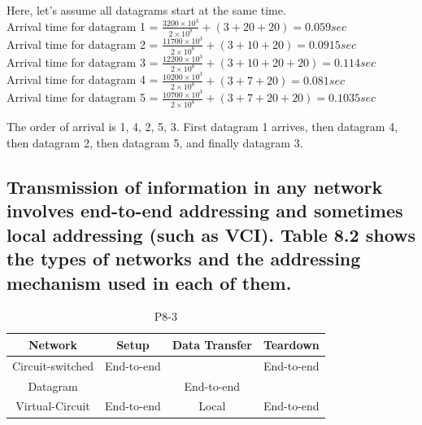 \documentclass{article}
\begin{document}
Here, let's assume all datagrams start at the same time. \\
Arrival time for datagram 1 = $ \frac{3200 \times 10^3}{2 \times 10^8} + (3 + 20 + 20) = 0.059 sec $ \\
Arrival time for datagram 2 = $ \frac{11700 \times 10^3}{2 \times 10^8} + (3 + 10 + 20) = 0.0915 sec $ \\
Arrival time for datagram 3 = $ \frac{12200 \times 10^3}{2 \times 10^8} + (3 + 10 + 20 + 20) = 0.114 sec $ \\
Arrival time for datagram 4 = $ \frac{10200 \times 10^3}{2 \times 10^8} + (3 + 7 + 20) = 0.081 sec $ \\
Arrival time for datagram 5 = $ \frac{10700 \times 10^3}{2 \times 10^8} + (3 + 7 + 20 + 20) = 0.1035 sec $ \par
The order of arrival is 1, 4, 2, 5, 3. First datagram 1 arrives, then datagram 4, then datagram 2, then datagram 5, and finally datagram 3. \par

\subsection{
	Transmission of information in any network involves end-to-end addressing
	and sometimes local addressing (such as VCI). Table 8.2 shows the types of
	networks and the addressing mechanism used in each of them.
}
\begin{table}[H]
	\centering
	\begin{tabular}{ | c | c | c | c | }
		\hline
		Network          & Setup      & Data Transfer & Teardown   \\
		\hline
		Circuit-switched & End-to-end &               & End-to-end \\
		\hline
		Datagram         &            & End-to-end    &            \\
		\hline
		Virtual-Circuit  & End-to-end & Local         & End-to-end \\
		\hline
	\end{tabular}
	\caption{P8-3}
	\label{table:2}
\end{table}
\end{document}
